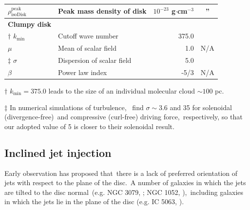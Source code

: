 \documentclass[twocolumn]{aastex631}
\begin{document}
\begin{table}[t]
\begin{tabular}{@{}llrc@{}}
$\rho_{\text{isoDisk}}^{\text{peak}}$ & Peak mass density of disk                 & $10^{-23}$ g$\cdot$cm$^{-3}$         & \multicolumn{1}{c}{''}         \\ \hline
{\bf Clumpy disk }                    &                                           &                                      &                                \\
$\dagger$  $k_{\text{min}}$           & Cutoff wave number                        & 375.0                                & \citep{peak-ism-density}       \\
$\mu$                                 & Mean of scalar field                      & 1.0                                  &   N/A                          \\
$\ddag$  $\sigma$                     & Dispersion of scalar field                & 5.0                                  & \citep{Federrath2010}          \\
$\beta$                               & Power law index                           & -5/3                                 &   N/A                          \\ \midrule
\end{tabular}
\begin{tablenotes}
      \raggedright
      \item  $\dagger$  $k_{\text{min}}=375.0$ leads to the size of an individual molecular cloud $\sim 100$ pc.
      \item  $\ddag$ In numerical simulations of turbulence,\
             \citet{Federrath2010} find $\sigma\sim 3.6$ and 35 for solenoidal (divergence-free)\
             and compressive (curl-free) driving force,\
             respectively, so that our adopted value of 5 is closer to their solenoidal result.
    \end{tablenotes}
\end{table}


%

\subsection{Inclined jet injection}
  Early observation \citep{Gallimore2006} has proposed that\
  there is a lack of preferred orientation of jets with respect to the plane of the disc.\
  A number of galaxies in which the jets are tilted to the disc normal\
  (e.g. NGC 3079, \citealt{Cecil2001}; NGC 1052, \citealt{Dopita2015}),\
  including galaxies in which the jets lie in the plane of the disc (e.g. IC 5063, \citealt{Morganti2015}).
\end{document}
